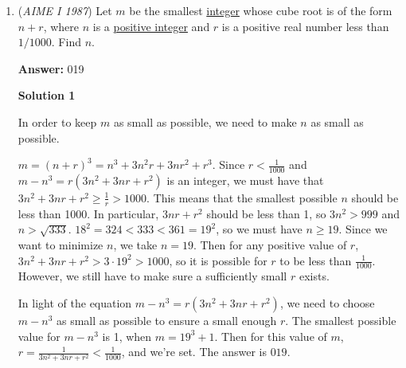 \begin{enumerate}
 



\textbf{Solution 3}

Proceed as in Solution 1 until it is noted that $m$ is a divisor of $2\cdot 3^{11}$. The divisors of $2\cdot 3^{11}$ are $3^{1} , 2\cdot 3^{1} , 3^{2} , 2\cdot 3^{2} , \ldots , 2\cdot 3^{10} , 3^{11}$. Note that the factors of $m(2n + m + 1)$ are of opposite parity (if $m$ is odd, then $(2n + m + 1)$ is even and vice versa). Thus, one of the two factors will be a power of three, and the other will be twice a power of three. $(2n + m + 1)$ will represent the greater factor while $m$ will represent the lesser factor. Given this information, we need to find the factor pair that maximizes the lesser of the two factors, as this will maximize the value of $m$. The factor pair which maximizes the lesser factor is $2\cdot 3^{5}$ and $3^{6}$. It follows that $m$ = $2\cdot 3^{5}$ = $\boxed{486}$.

 


	\item (\textit{AIME I 1987}) Let $m$ be the smallest \href{https://artofproblemsolving.com/wiki/index.php?title=Integer}{integer} whose cube root is of the form $n+r$, where $n$ is a \href{https://artofproblemsolving.com/wiki/index.php?title=Positive\_integer}{positive integer} and $r$ is a positive real number less than $1/1000$. Find $n$.


 
 \textbf{Answer: }019



\textbf{Solution 1}

In order to keep $m$ as small as possible, we need to make $n$ as small as possible.

 $m = (n + r)^3 = n^3 + 3n^2r + 3nr^2 + r^3$.  Since $r < \frac{1}{1000}$ and $m - n^3 = r(3n^2 + 3nr + r^2)$ is an integer, we must have that $3n^2 + 3nr + r^2 \geq \frac{1}{r} > 1000$.  This means that the smallest possible $n$ should be less than 1000. In particular, $3nr + r^2$ should be less than 1, so $3n^2 > 999$ and $n > \sqrt{333}$.  $18^2 = 324 < 333 < 361 = 19^2$, so we must have $n \geq 19$.  Since we want to minimize $n$, we take $n = 19$.  Then for any positive value of $r$, $3n^2 + 3nr + r^2 > 3\cdot 19^2 > 1000$, so it is possible for $r$ to be less than $\frac{1}{1000}$.  However, we still have to make sure a sufficiently small $r$ exists.  

 In light of the equation $m - n^3 = r(3n^2 + 3nr + r^2)$, we need to choose $m - n^3$ as small as possible to ensure a small enough $r$.  The smallest possible value for $m - n^3$ is 1, when $m = 19^3 + 1$.  Then for this value of $m$, $r = \frac{1}{3n^2 + 3nr + r^2} < \frac{1}{1000}$, and we're set.  The answer is  $\boxed{019}$.


\end{enumerate}
